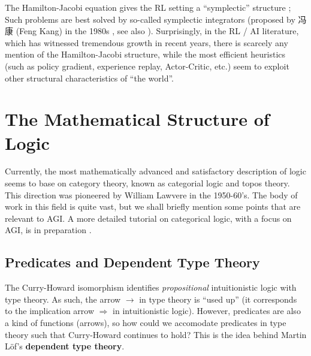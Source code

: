 \documentclass[orivec]{llncs}
\begin{document}
The Hamilton-Jacobi equation gives the RL setting a ``symplectic'' structure \cite{Mann2018};  Such problems are best solved by so-called symplectic integrators (proposed by 冯康 (Feng Kang) in the 1980s \cite{Feng2010}, see also \cite{Leimkuhler2004}).  Surprisingly, in the RL / AI literature, which has witnessed tremendous growth in recent years, there is scarcely any mention of the Hamilton-Jacobi structure, while the most efficient heuristics (such as policy gradient, experience replay, Actor-Critic, etc.) seem to exploit other structural characteristics of ``the world''.

\section{The Mathematical Structure of Logic}

Currently, the most mathematically advanced and satisfactory description of logic seems to base on category theory, known as categorial logic and topos theory.  This direction was pioneered by William Lawvere in the 1950-60's.  The body of work in this field is quite vast, but we shall briefly mention some points that are relevant to AGI.  A more detailed tutorial on categorical logic, with a focus on AGI, is in preparation \cite{Yan2021}.

\subsection{Predicates and Dependent Type Theory}
\label{sec:dependent-types}

The Curry-Howard isomorphism identifies \textit{propositional} intuitionistic logic with type theory.  As such, the arrow $\rightarrow$ in type theory is ``used up'' (it corresponds to the implication arrow $\Rightarrow$ in intuitionistic logic).  However, predicates are also a kind of functions (arrows), so how could we accomodate predicates in type theory such that Curry-Howard continues to hold?  This is the idea behind Martin L\"{o}f's \textbf{dependent type theory}.
\end{document}
